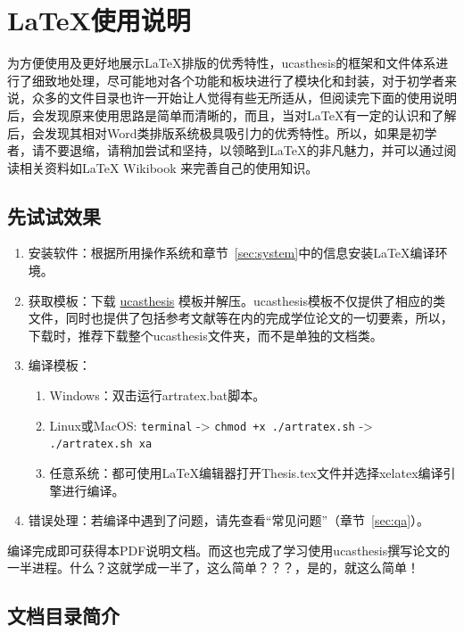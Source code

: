 \chapter{\LaTeX{}使用说明}\label{chap:guide}

为方便使用及更好地展示\LaTeX{}排版的优秀特性，ucasthesis的框架和文件体系进行了细致地处理，尽可能地对各个功能和板块进行了模块化和封装，对于初学者来说，众多的文件目录也许一开始让人觉得有些无所适从，但阅读完下面的使用说明后，会发现原来使用思路是简单而清晰的，而且，当对\LaTeX{}有一定的认识和了解后，会发现其相对Word类排版系统极具吸引力的优秀特性。所以，如果是初学者，请不要退缩，请稍加尝试和坚持，以领略到\LaTeX{}的非凡魅力，并可以通过阅读相关资料如\LaTeX{} Wikibook \citep{wikibook2014latex} 来完善自己的使用知识。

\section{先试试效果}

\begin{enumerate}
    \item 安装软件：根据所用操作系统和章节~\ref{sec:system}中的信息安装\LaTeX{}编译环境。
    \item 获取模板：下载 \href{https://github.com/mohuangrui/ucasthesis}{ucasthesis} 模板并解压。ucasthesis模板不仅提供了相应的类文件，同时也提供了包括参考文献等在内的完成学位论文的一切要素，所以，下载时，推荐下载整个ucasthesis文件夹，而不是单独的文档类。
    \item 编译模板：
        \begin{enumerate}
            \item Windows：双击运行artratex.bat脚本。
            \item Linux或MacOS: {\scriptsize \verb|terminal| -> \verb|chmod +x ./artratex.sh| -> \verb|./artratex.sh xa|}
            \item 任意系统：都可使用\LaTeX{}编辑器打开Thesis.tex文件并选择xelatex编译引擎进行编译。
        \end{enumerate}
    \item 错误处理：若编译中遇到了问题，请先查看“常见问题”（章节~\ref{sec:qa}）。
\end{enumerate}

编译完成即可获得本PDF说明文档。而这也完成了学习使用ucasthesis撰写论文的一半进程。什么？这就学成一半了，这么简单？？？，是的，就这么简单！

\section{文档目录简介}

